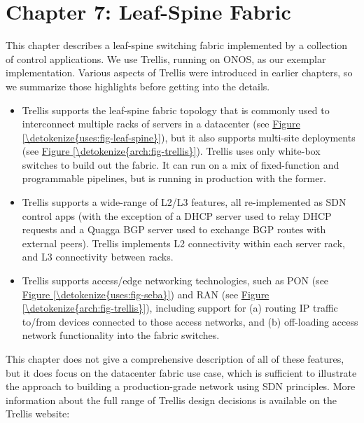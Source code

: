 \documentclass[letterpaper,11pt,english]{sphinxmanual}
\begin{document}
\chapter{Chapter 7:  Leaf-Spine Fabric}
\label{\detokenize{trellis:chapter-7-leaf-spine-fabric}}\label{\detokenize{trellis::doc}}
This chapter describes a leaf-spine switching fabric implemented by a
collection of control applications. We use Trellis, running on ONOS,
as our exemplar implementation. Various aspects of Trellis were
introduced in earlier chapters, so we summarize those highlights
before getting into the details.
\begin{itemize}
\item {} 
Trellis supports the leaf-spine fabric topology that is commonly
used to interconnect multiple racks of servers in a datacenter (see
\hyperref[\detokenize{uses:fig-leaf-spine}]{Figure \ref{\detokenize{uses:fig-leaf-spine}}}), but it also supports
multi-site deployments (see \hyperref[\detokenize{arch:fig-trellis}]{Figure \ref{\detokenize{arch:fig-trellis}}}).
Trellis uses only white-box switches to build out the fabric. It can
run on a mix of fixed-function and programmable pipelines, but is
running in production with the former.

\item {} 
Trellis supports a wide-range of L2/L3 features, all re-implemented
as SDN control apps (with the exception of a DHCP server used to
relay DHCP requests and a Quagga BGP server used to exchange BGP
routes with external peers). Trellis implements L2 connectivity
within each server rack, and L3 connectivity between racks.

\item {} 
Trellis supports access/edge networking technologies, such as PON
(see \hyperref[\detokenize{uses:fig-seba}]{Figure \ref{\detokenize{uses:fig-seba}}}) and RAN (see \hyperref[\detokenize{arch:fig-trellis}]{Figure \ref{\detokenize{arch:fig-trellis}}}), including support for (a) routing IP traffic
to/from devices connected to those access networks, and (b)
off-loading access network functionality into the fabric switches.

\end{itemize}

This chapter does not give a comprehensive description of all of these
features, but it does focus on the datacenter fabric use case, which
is sufficient to illustrate the approach to building a
production-grade network using SDN principles. More information about
the full range of Trellis design decisions is available on the Trellis
website:
\end{document}
